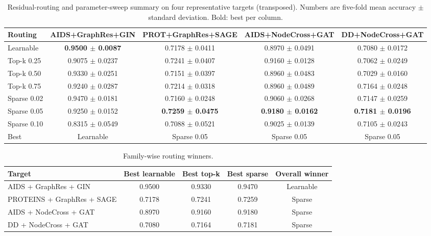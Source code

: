 \begin{table}[t]
\centering
\scriptsize
\setlength{\tabcolsep}{3.5pt}
\caption{Residual-routing and parameter-sweep summary on four representative targets (transposed). Numbers are five-fold mean accuracy $\pm$ standard deviation. Bold: best per column.}
\label{tab:residual_routing_full}
\begin{tabular}{lcccc}
\toprule
Routing & AIDS+GraphRes+GIN & PROT+GraphRes+SAGE & AIDS+NodeCross+GAT & DD+NodeCross+GAT \\
\midrule
Learnable & \textbf{0.9500 $\pm$ 0.0087} & 0.7178 $\pm$ 0.0411 & 0.8970 $\pm$ 0.0491 & 0.7080 $\pm$ 0.0172 \\
Top-k 0.25 & 0.9075 $\pm$ 0.0237 & 0.7241 $\pm$ 0.0407 & 0.9160 $\pm$ 0.0128 & 0.7062 $\pm$ 0.0249 \\
Top-k 0.50 & 0.9330 $\pm$ 0.0251 & 0.7151 $\pm$ 0.0397 & 0.8960 $\pm$ 0.0483 & 0.7029 $\pm$ 0.0160 \\
Top-k 0.75 & 0.9240 $\pm$ 0.0287 & 0.7214 $\pm$ 0.0318 & 0.8960 $\pm$ 0.0489 & 0.7164 $\pm$ 0.0248 \\
Sparse 0.02 & 0.9470 $\pm$ 0.0181 & 0.7160 $\pm$ 0.0248 & 0.9060 $\pm$ 0.0268 & 0.7147 $\pm$ 0.0259 \\
Sparse 0.05 & 0.9250 $\pm$ 0.0152 & \textbf{0.7259 $\pm$ 0.0475} & \textbf{0.9180 $\pm$ 0.0162} & \textbf{0.7181 $\pm$ 0.0196} \\
Sparse 0.10 & 0.8315 $\pm$ 0.0549 & 0.7088 $\pm$ 0.0521 & 0.9025 $\pm$ 0.0139 & 0.7105 $\pm$ 0.0243 \\
\midrule
Best & Learnable & Sparse 0.05 & Sparse 0.05 & Sparse 0.05 \\
\bottomrule
\end{tabular}
\end{table}

\begin{table}[t]
\centering
\footnotesize
\caption{Family-wise routing winners.}
\label{tab:residual_routing_family}
\begin{tabular}{lcccc}
\toprule
Target & Best learnable & Best top-k & Best sparse & Overall winner \\
\midrule
AIDS + GraphRes + GIN & 0.9500 & 0.9330 & 0.9470 & Learnable \\
PROTEINS + GraphRes + SAGE & 0.7178 & 0.7241 & 0.7259 & Sparse \\
AIDS + NodeCross + GAT & 0.8970 & 0.9160 & 0.9180 & Sparse \\
DD + NodeCross + GAT & 0.7080 & 0.7164 & 0.7181 & Sparse \\
\bottomrule
\end{tabular}
\end{table}

